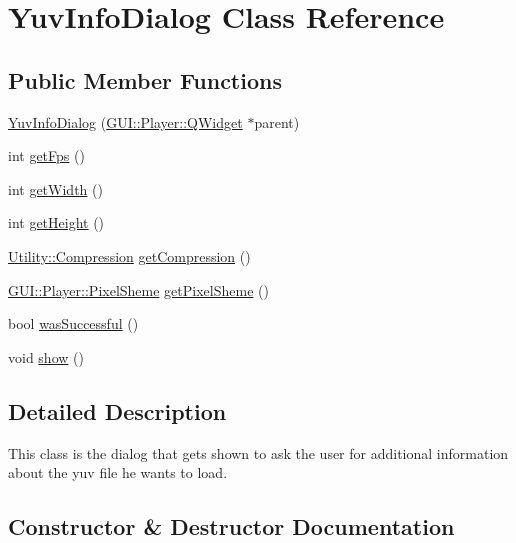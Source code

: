 \hypertarget{classGUI_1_1Player_1_1YuvInfoDialog}{}\section{Yuv\+Info\+Dialog Class Reference}
\label{classGUI_1_1Player_1_1YuvInfoDialog}
\subsection*{Public Member Functions}
\begin{DoxyCompactItemize}
\item 
\hyperlink{classGUI_1_1Player_1_1YuvInfoDialog_aa6e96993be7b143f52457c2233cd034d}{Yuv\+Info\+Dialog} (\hyperlink{classGUI_1_1Player_1_1QWidget}{G\+U\+I\+::\+Player\+::\+Q\+Widget} $\ast$parent)
\item 
int \hyperlink{classGUI_1_1Player_1_1YuvInfoDialog_a519ad5c0664b9de28c1a6d9dc77f959d}{get\+Fps} ()
\item 
int \hyperlink{classGUI_1_1Player_1_1YuvInfoDialog_a67a0997183f24da19b776d96c1052998}{get\+Width} ()
\item 
int \hyperlink{classGUI_1_1Player_1_1YuvInfoDialog_a07efb2a4e9a982688c8bb3c3f21d1092}{get\+Height} ()
\item 
\hyperlink{namespaceUtility_a56a83bf6847f4801f4205eb4be237ccf}{Utility\+::\+Compression} \hyperlink{classGUI_1_1Player_1_1YuvInfoDialog_a000ce702632feab3b3c87d4416f0b3d3}{get\+Compression} ()
\item 
\hyperlink{namespaceGUI_1_1Player_a52432774abcaf0c8c417ae77739fccfc}{G\+U\+I\+::\+Player\+::\+Pixel\+Sheme} \hyperlink{classGUI_1_1Player_1_1YuvInfoDialog_a1a60961a134cca971594bbeff8a60ebe}{get\+Pixel\+Sheme} ()
\item 
bool \hyperlink{classGUI_1_1Player_1_1YuvInfoDialog_a6677ab283cdae9435a6be93d9c3481b2}{was\+Successful} ()
\item 
void \hyperlink{classGUI_1_1Player_1_1YuvInfoDialog_a4b148f40a95444d5669406b918ad2f52}{show} ()
\end{DoxyCompactItemize}


\subsection{Detailed Description}
This class is the dialog that gets shown to ask the user for additional information about the yuv file he wants to load. 

\subsection{Constructor \& Destructor Documentation}
\hypertarget{classGUI_1_1Player_1_1YuvInfoDialog_aa6e96993be7b143f52457c2233cd034d}{}
